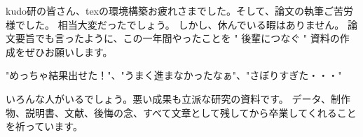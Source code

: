 \begin{acknowledgment}

kudo研の皆さん、texの環境構築お疲れさまでした。そして、論文の執筆ご苦労様でした。
相当大変だったでしょう。
しかし、休んでいる暇はありません。
論文要旨でも言ったように、この一年間やったことを " 後輩につなぐ " 資料の作成をぜひお願いします。

"めっちゃ結果出せた！"、"うまく進まなかったなぁ"、"さぼりすぎた・・・"

いろんな人がいるでしょう。悪い成果も立派な研究の資料です。
データ、制作物、説明書、文献、後悔の念、すべて文章として残してから卒業してくれることを祈っています。

\end{acknowledgment}